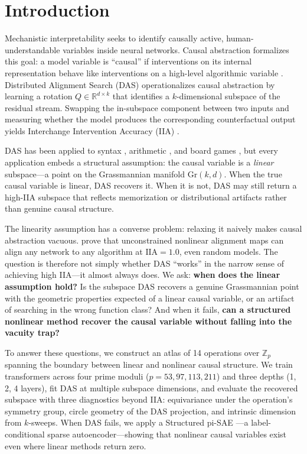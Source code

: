 \documentclass{article}
\newcommand{\Gr}{\mathrm{Gr}}
\newcommand{\IIA}{\mathrm{IIA}}
\newcommand{\R}{\mathbb{R}}
\newcommand{\Z}{\mathbb{Z}}
\begin{document}
\section{Introduction}
\label{sec:intro}

Mechanistic interpretability seeks to identify causally active,
human-understandable variables inside neural networks. Causal abstraction
formalizes this goal: a model variable is ``causal'' if interventions on its
internal representation behave like interventions on a high-level algorithmic
variable \citep{geiger2021causal}. Distributed Alignment Search (DAS)
operationalizes causal abstraction by learning a rotation $Q \in \R^{d \times k}$
that identifies a $k$-dimensional subspace of the residual stream. Swapping the
in-subspace component between two inputs and measuring whether the model
produces the corresponding counterfactual output yields Interchange Intervention
Accuracy (IIA) \citep{geiger2023finding}.

DAS has been applied to syntax \citep{geiger2023finding}, arithmetic
\citep{wu2024interpretability}, and board games \citep{li2023emergent}, but
every application embeds a structural assumption: the causal variable is a
\emph{linear} subspace---a point on the Grassmannian manifold $\Gr(k,d)$. When
the true causal variable is linear, DAS recovers it. When it is not, DAS may
still return a high-IIA subspace that reflects memorization or distributional
artifacts rather than genuine causal structure.

The linearity assumption has a converse problem: relaxing it naively makes
causal abstraction vacuous. \citet{sutter2025nonlinear} prove that
unconstrained nonlinear alignment maps can align any network to any algorithm
at $\IIA = 1.0$, even random models. The question is therefore not simply
whether DAS ``works'' in the narrow sense of achieving high IIA---it almost
always does. We ask: \textbf{when does the linear assumption hold?} Is the
subspace DAS recovers a genuine Grassmannian point with the geometric
properties expected of a linear causal variable, or an artifact of searching
in the wrong function class? And when it fails, \textbf{can a structured
nonlinear method recover the causal variable without falling into the
vacuity trap?}

To answer these questions, we construct an atlas of 14 operations over $\Z_p$
spanning the boundary between linear and nonlinear causal structure. We train
transformers across four prime moduli ($p = 53, 97, 113, 211$) and three
depths (1, 2, 4 layers), fit DAS at multiple subspace dimensions, and
evaluate the recovered subspace with three diagnostics beyond IIA:
equivariance under the operation's symmetry group, circle geometry of the DAS
projection, and intrinsic dimension from $k$-sweeps. When DAS fails, we apply
a Structured pi-SAE \citep{narayanaswamy2017learning}---a label-conditional
sparse autoencoder---showing that nonlinear causal variables exist even where
linear methods return zero.
\end{document}
